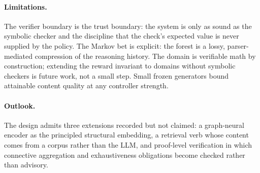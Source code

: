 \paragraph{Limitations.}
The verifier boundary is the trust boundary: the system is only as sound as
the symbolic checker and the discipline that the check's expected value is
never supplied by the policy. The Markov bet is explicit: the forest is a
lossy, parser-mediated compression of the reasoning history. The domain is
verifiable math by construction; extending the reward invariant to domains
without symbolic checkers is future work, not a small step. Small frozen
generators bound attainable content quality at any controller strength.

\paragraph{Outlook.} The design admits three extensions recorded but not
claimed: a graph-neural encoder as the principled structural embedding, a
retrieval verb whose content comes from a corpus rather than the LLM, and
proof-level verification in which connective aggregation and exhaustiveness
obligations become checked rather than advisory.
